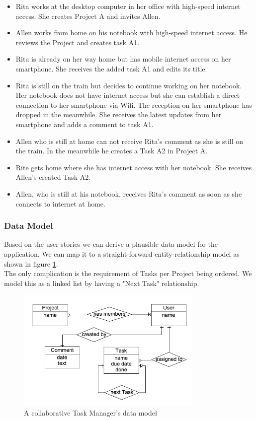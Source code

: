\begin{itemize}
\item Rita works at the desktop computer in her office with high-speed internet access. She creates Project A and invites Allen.
\item Allen works from home on his notebook with high-speed internet access. He reviews the Project and creates task A1.
\item Rita is already on her way home but has mobile internet access on her smartphone. She receives the added task A1 and edits its title.
\item Rita is still on the train but decides to continue working on her notebook. Her notebook does not have internet access but she can establish a direct connection to her smartphone via Wifi. The reception on her smartphone has dropped in the meanwhile. She receives the latest updates from her smartphone and adds a comment to task A1.
\item Allen who is still at home can not receive Rita's comment as she is still on the train. In the meanwhile he creates a Task A2 in Project A.
\item Rite gets home where she has internet access with her notebook. She receives Allen's created Task A2.
\item Allen, who is still at his notebook, receives Rita's comment as soon as she connects to internet at home.
\end{itemize}

\subsubsection{Data Model}
Based on the user stories we can derive a plausible data model for the application. We can map it to a straight-forward entity-relationship model as shown in figure \ref{fig:tasks-data-model}.\\
The only complication is the requirement of Tasks per Project being ordered. We model this as a linked list by having a "Next Task" relationship.

\begin{figure}[tasks-data-model]
\centering
\includegraphics[width=0.8\textwidth]{img/tasks-schema}
\caption{A collaborative Task Manager's data model}
\label{fig:tasks-data-model}
\end{figure}


